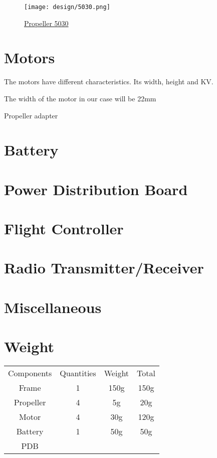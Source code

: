 \begin{figure}[!ht]
    \centering
    \texttt{[image: design/5030.png]}
    \caption{\href{https://www.banggood.com/2pcs-WSX-5030-53-Inch-ABS-Propeller-White-CWCCW-for-RC-Drone-FPV-Racing-Multirotors-p-1387499.html?rmmds=search&cur_warehouse=CN}{Propeller 5030}}
    \label{fig:5030}
\end{figure}

\section{Motors}
The motors have different characteristics. Its width, height and KV.

The width of the motor in our case will be 22mm

Propeller adapter

\section{Battery}

\section{Power Distribution Board}

\section{Flight Controller}

\section{Radio Transmitter/Receiver}

\section{Miscellaneous}

\section{Weight}
\centering
\begin{tabular}{cccc}
    Components & Quantities & Weight & Total \\
    Frame      & 1          & 150g   & 150g  \\
    Propeller  & 4          & 5g     & 20g   \\
    Motor      & 4          & 30g    & 120g  \\
    Battery    & 1          & 50g    & 50g   \\
    PDB
\end{tabular}
